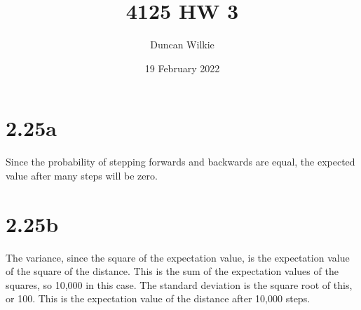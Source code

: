 \documentclass{article}
\title{4125 HW 3}
\author{Duncan Wilkie}
\date{19 February 2022}
\begin{document}
\maketitle

\section*{2.25a}
Since the probability of stepping forwards and backwards are equal, the expected value after many steps will be zero.

\section*{2.25b}
The variance, since the square of the expectation value, is the expectation value of the square of the distance. This is the sum of the expectation values of the squares, so 10,000 in this case. The standard deviation is the square root of this, or 100. This is the expectation value of the distance after 10,000 steps.
\end{document}
